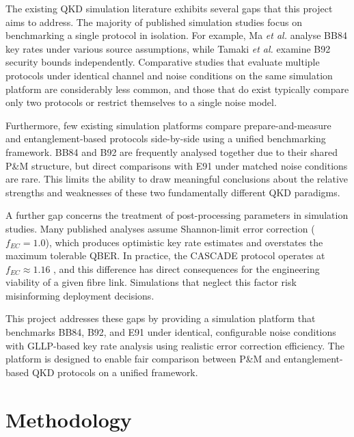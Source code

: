 \documentclass[10pt, a4paper]{report}
\begin{document}
The existing QKD simulation literature exhibits several gaps that this project aims to address. The majority of published simulation studies focus on benchmarking a single protocol in isolation. For example, Ma \textit{et al.} \cite{Ma2005} analyse BB84 key rates under various source assumptions, while Tamaki \textit{et al.} \cite{Tamaki2014} examine B92 security bounds independently. Comparative studies that evaluate multiple protocols under identical channel and noise conditions on the same simulation platform are considerably less common, and those that do exist typically compare only two protocols or restrict themselves to a single noise model.

Furthermore, few existing simulation platforms compare prepare-and-measure and entanglement-based protocols side-by-side using a unified benchmarking framework. BB84 and B92 are frequently analysed together due to their shared P\&M structure, but direct comparisons with E91 under matched noise conditions are rare. This limits the ability to draw meaningful conclusions about the relative strengths and weaknesses of these two fundamentally different QKD paradigms.

A further gap concerns the treatment of post-processing parameters in simulation studies. Many published analyses assume Shannon-limit error correction ($f_{EC} = 1.0$), which produces optimistic key rate estimates and overstates the maximum tolerable QBER. In practice, the CASCADE protocol operates at $f_{EC} \approx 1.16$ \cite{Cascade1994}, and this difference has direct consequences for the engineering viability of a given fibre link. Simulations that neglect this factor risk misinforming deployment decisions.

This project addresses these gaps by providing a simulation platform that benchmarks BB84, B92, and E91 under identical, configurable noise conditions with GLLP-based key rate analysis using realistic error correction efficiency. The platform is designed to enable fair comparison between P\&M and entanglement-based QKD protocols on a unified framework.





\chapter{Methodology}
\end{document}

